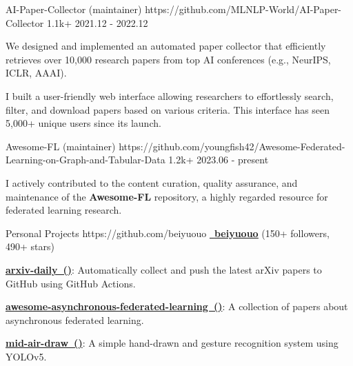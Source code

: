 \begin{cventries}
\cvproject
{AI-Paper-Collector (maintainer)} %
{https://github.com/MLNLP-World/AI-Paper-Collector}
{1.1k+} %
{2021.12 - 2022.12} %
{
\begin{cvitems} %
\item {We designed and implemented an automated paper collector that efficiently retrieves over 10,000 research papers from top AI conferences (e.g., NeurIPS, ICLR, AAAI).}
\item {I built a user-friendly web interface allowing researchers to effortlessly search, filter, and download papers based on various criteria. This interface has seen 5,000+ unique users since its launch.}
\end{cvitems}
} %


\cvproject
{Awesome-FL (maintainer)} %
{https://github.com/youngfish42/Awesome-Federated-Learning-on-Graph-and-Tabular-Data}
{1.2k+} %
{2023.06 - present} %
{
\begin{cvitems} %
\item {I actively contributed to the content curation, quality assurance, and maintenance of the \textbf{Awesome-FL} repository, a highly regarded resource for federated learning research. }
\end{cvitems}
} %



\cvproject
{Personal Projects} %
{https://github.com/beiyuouo} %
{} %
{\href{https://github.com/beiyuouo}{\textcolor{text}{\faGithub~\textbf{\underline{beiyuouo}}}} (150+ followers, 490+ stars)} %
{
\begin{cvitems} %
\item {\href{https://github.com/beiyuouo/arxiv-daily}{\textbf{arxiv-daily~()}}: Automatically collect and push the latest arXiv papers to GitHub using GitHub Actions.}
\item {\href{https://github.com/beiyuouo/awesome-asynchronous-federated-learning}{\textbf{awesome-asynchronous-federated-learning~()}}: A collection of papers about asynchronous federated learning.}
\item {\href{https://github.com/beiyuouo/mid-air-draw}{\textbf{mid-air-draw~()}}: A simple hand-drawn and gesture recognition system using YOLOv5.}
\end{cvitems}
} %


\end{cventries}
